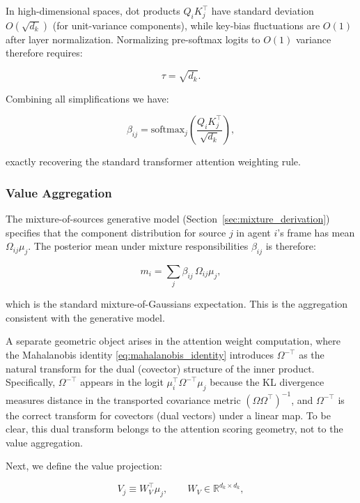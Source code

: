 \documentclass[twoside,11pt]{article}
\begin{document}
In high-dimensional spaces, dot products $Q_iK_j^\top$ have standard deviation $O(\sqrt{d_k})$ (for unit-variance components), while key-bias fluctuations are $O(1)$ after layer normalization. Normalizing pre-softmax logits to $O(1)$ variance therefore requires:

\begin{equation}
\tau = \sqrt{d_k}.
\end{equation}

Combining all simplifications we have:

\begin{equation}
\boxed{\beta_{ij} = \mathrm{softmax}_j\left(\frac{Q_i K_j^\top}{\sqrt{d_k}}\right)},
\end{equation}

exactly recovering the standard transformer attention weighting rule.

\subsubsection{Value Aggregation}

The mixture-of-sources generative model (Section~\ref{sec:mixture_derivation}) specifies that the component distribution for source $j$ in agent $i$'s frame has mean $\Omega_{ij}\mu_j$. The posterior mean under mixture responsibilities $\beta_{ij}$ is therefore:

\begin{equation}
m_i = \sum_j \beta_{ij}\, \Omega_{ij}\mu_j,
\label{eq:glk_mixture_aggregation}
\end{equation}

which is the standard mixture-of-Gaussians expectation. This is the aggregation consistent with the generative model.

A separate geometric object arises in the attention weight computation, where the Mahalanobis identity \eqref{eq:mahalanobis_identity} introduces $\Omega^{-\top}$ as the natural transform for the dual (covector) structure of the inner product. Specifically, $\Omega^{-\top}$ appears in the logit $\mu_i^\top \Omega^{-\top}\mu_j$ because the KL divergence measures distance in the transported covariance metric $(\Omega\Omega^\top)^{-1}$, and $\Omega^{-\top}$ is the correct transform for covectors (dual vectors) under a linear map. To be clear, this dual transform belongs to the attention scoring geometry, not to the value aggregation.


Next, we define the value projection:

\begin{equation}
V_j \equiv  W_V^{\top}\mu_j, \qquad W_V \in \mathbb{R}^{d_k \times d_k},
\end{equation}
\end{document}
